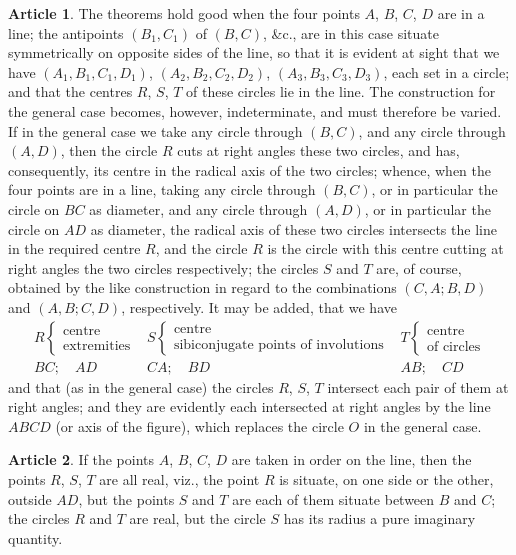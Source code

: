 \documentclass[11pt,a4paper]{article}
\theoremstyle{definition}
\newtheorem{art}{Article}
\begin{document}
\begin{art}
The theorems hold good when the four points $A$, $B$, $C$, $D$ are in a line; the antipoints $(B_{1}, C_{1})$ of $(B, C)$, \&c., are in this case situate symmetrically on opposite sides of the line, so that it is evident at sight that we have $(A_{1}, B_{1}, C_{1}, D_{1})$, $(A_{2}, B_{2}, C_{2}, D_{2})$, $(A_{3}, B_{3}, C_{3}, D_{3})$, each set in a circle; and that the centres $R$, $S$, $T$ of these circles lie in the line. The construction for the general case becomes, however, indeterminate, and must therefore be varied. If in the general case we take any circle through $(B, C)$, and any circle through $(A, D)$, then the circle $R$ cuts at right angles these two circles, and has, consequently, its centre in the radical axis of the two circles; whence, when the four points are in a line, taking any circle through $(B, C)$, or in particular the circle on $BC$ as diameter, and any circle through $(A, D)$, or in particular the circle on $AD$ as diameter, the radical axis of these two circles intersects the line in the required centre $R$, and the circle $R$ is the circle with this centre cutting at right angles the two circles respectively; the circles $S$ and $T$ are, of course, obtained by the like construction in regard to the combinations $(C, A; B, D)$ and $(A, B; C, D)$, respectively. It may be added, that we have
\[
\begin{array}{c|c|c}
R \left\{\begin{array}{c}\text{centre} \\ \text{extremities} \end{array}\right. &
S \left\{\begin{array}{c}\text{centre} \\ \text{sibiconjugate points of involutions} \end{array}\right. &
T \left\{\begin{array}{c}\text{centre} \\ \text{of circles} \end{array}\right. \\ \hline
BC; \quad AD & CA; \quad BD & AB; \quad CD
\end{array}
\]
and that (as in the general case) the circles $R$, $S$, $T$ intersect each pair of them at right angles; and they are evidently each intersected at right angles by the line $ABCD$ (or axis of the figure), which replaces the circle $O$ in the general case.
\end{art}

\begin{art}
If the points $A$, $B$, $C$, $D$ are taken in order on the line, then the points $R$, $S$, $T$ are all real, viz., the point $R$ is situate, on one side or the other, outside $AD$, but the points $S$ and $T$ are each of them situate between $B$ and $C$; the circles $R$ and $T$ are real, but the circle $S$ has its radius a pure imaginary quantity.
\end{art}
\end{document}
